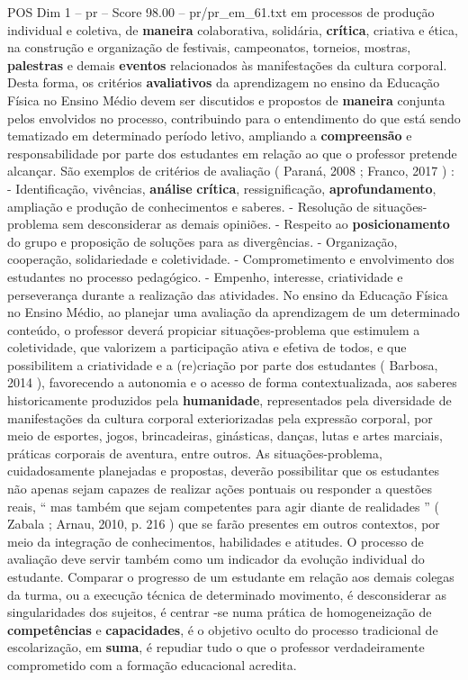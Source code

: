 \begin{textsample}{POS Dim 1 – pr – Score 98.00 – pr/pr\_em\_61.txt}
em processos de produção individual e coletiva, de \textbf{maneira} colaborativa, solidária, \textbf{crítica}, criativa e ética, na construção e organização de festivais, campeonatos, torneios, mostras, \textbf{palestras} e demais \textbf{eventos} relacionados às manifestações da cultura corporal.
Desta forma, os critérios \textbf{avaliativos} da aprendizagem no ensino da Educação Física no Ensino Médio devem ser discutidos e propostos de \textbf{maneira} conjunta pelos envolvidos no processo, contribuindo para o entendimento do que está sendo tematizado em determinado período letivo, ampliando a \textbf{compreensão} e responsabilidade por parte dos estudantes em relação ao que o professor pretende alcançar.
São exemplos de critérios de avaliação ( Paraná, 2008 ; Franco, 2017 ) : - Identificação, vivências, \textbf{análise} \textbf{crítica}, ressignificação, \textbf{aprofundamento}, ampliação e produção de conhecimentos e saberes. - Resolução de situações-problema sem desconsiderar as demais opiniões. - Respeito ao \textbf{posicionamento} do grupo e proposição de soluções para as divergências. - Organização, cooperação, solidariedade e coletividade. - Comprometimento e envolvimento dos estudantes no processo pedagógico. - Empenho, interesse, criatividade e perseverança durante a realização das atividades.
No ensino da Educação Física no Ensino Médio, ao planejar uma avaliação da aprendizagem de um determinado conteúdo, o professor deverá propiciar situações-problema que estimulem a coletividade, que valorizem a participação ativa e efetiva de todos, e que possibilitem a criatividade e a (re)criação por parte dos estudantes ( Barbosa, 2014 ), favorecendo a autonomia e o acesso de forma contextualizada, aos saberes historicamente produzidos pela \textbf{humanidade}, representados pela diversidade de manifestações da cultura corporal exteriorizadas pela expressão corporal, por meio de esportes, jogos, brincadeiras, ginásticas, danças, lutas e artes marciais, práticas corporais de aventura, entre outros.
As situações-problema, cuidadosamente planejadas e propostas, deverão possibilitar que os estudantes não apenas sejam capazes de realizar ações pontuais ou responder a questões reais, “ mas também que sejam competentes para agir diante de realidades ” ( Zabala ; Arnau, 2010, p. 216 ) que se farão presentes em outros contextos, por meio da integração de conhecimentos, habilidades e atitudes.
O processo de avaliação deve servir também como um indicador da evolução individual do estudante.
Comparar o progresso de um estudante em relação aos demais colegas da turma, ou a execução técnica de determinado movimento, é desconsiderar as singularidades dos sujeitos, é centrar -se numa prática de homogeneização de \textbf{competências} e \textbf{capacidades}, é o objetivo oculto do processo tradicional de escolarização, em \textbf{suma}, é repudiar tudo o que o professor verdadeiramente comprometido com a formação educacional acredita.

\end{textsample}
